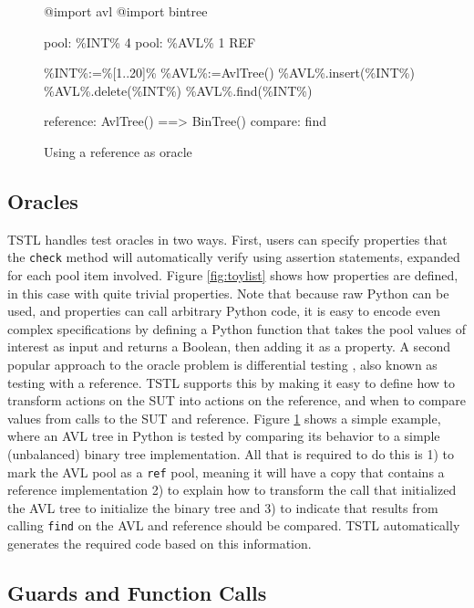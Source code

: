 \documentclass[runningheads,a4paper]{llncs}
\begin{document}
\begin{figure}
{\scriptsize
\begin{code}
@import avl
@import bintree

pool: \%INT\% 4
pool: \%AVL\% 1 REF

\%INT\%:=\%[1..20]\%
\%AVL\%:=AvlTree()
\%AVL\%.insert(\%INT\%)
\%AVL\%.delete(\%INT\%)
\%AVL\%.find(\%INT\%)

reference: AvlTree() ==> BinTree()
compare: find

\end{code}
}
\caption{Using a reference as oracle}
\label{fig:binref}
\vspace{-0.25in}
\end{figure}

\subsection{Oracles}

TSTL handles test oracles in two ways.  First, users can specify
properties that the {\tt check} method will automatically verify using
assertion statements, expanded for each pool item involved.  Figure
\ref{fig:toylist} shows how properties are defined, in this case with
quite trivial properties.  Note that because raw Python can be used,
and properties can call arbitrary Python code, it is easy to encode
even complex specifications by defining a Python function that takes
the pool values of interest as input and returns a Boolean, then
adding it as a property.  A second popular approach to the oracle
problem is differential testing \cite{Differential}, also known as testing
with a reference.  TSTL supports this by making it easy to define how
to transform actions on the SUT into actions on the reference, and
when to compare values from calls to the SUT and reference.  Figure
\ref{fig:binref} shows a simple example, where an AVL tree in Python
is tested by comparing its behavior to a simple (unbalanced) binary
tree implementation.  All that is required to do this is 1) to mark
the AVL pool as a {\tt ref} pool, meaning it will have a copy that
contains a reference implementation 2) to explain how to transform the
call that initialized the AVL tree to initialize the binary tree and
3) to indicate that results from calling {\tt find} on the AVL and
reference should be compared.  TSTL automatically generates the required 
code based on this information.

\subsection{Guards and Function Calls}
\label{sec:guards}
\end{document}
